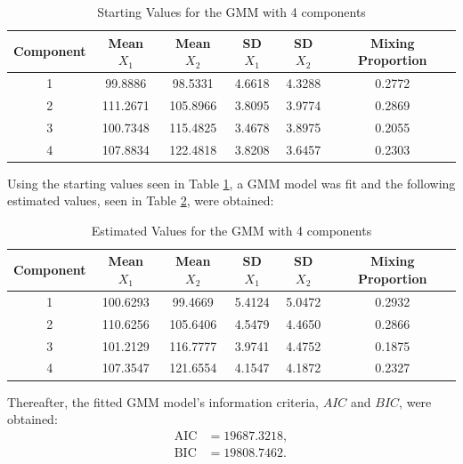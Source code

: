 \begin{enumerate}[label=\roman*.]
          \begin{table}[h]
            \centering
            \caption{Starting Values for the GMM with 4 components}
            \begin{tabular}{cccccc}
            \hline
            Component & Mean $X_1$ & Mean $X_2$ & SD $X_1$ & SD $X_2$ & Mixing Proportion \\
            \hline
            1 & 99.8886  & 98.5331  & 4.6618 & 4.3288 & 0.2772 \\
            2 & 111.2671 & 105.8966 & 3.8095 & 3.9774 & 0.2869 \\
            3 & 100.7348 & 115.4825 & 3.4678 & 3.8975 & 0.2055 \\
            4 & 107.8834 & 122.4818 & 3.8208 & 3.6457 & 0.2303 \\
            \hline
            \end{tabular}
            \label{tab:gmm_starting_values_4}
          \end{table}

          \newpage

          Using the starting values seen in Table \ref{tab:gmm_starting_values_4}, a GMM model
          was fit and the following estimated values, seen in Table \ref{tab:gmm_estimated_values_4}, were obtained:

          \begin{table}[h]
            \centering
            \caption{Estimated Values for the GMM with 4 components}
            \begin{tabular}{cccccc}
            \hline
            Component & Mean $X_1$ & Mean $X_2$ & SD $X_1$ & SD $X_2$ & Mixing Proportion \\
            \hline
            1 & 100.6293 & 99.4669  & 5.4124 & 5.0472 & 0.2932 \\
            2 & 110.6256 & 105.6406 & 4.5479 & 4.4650 & 0.2866 \\
            3 & 101.2129 & 116.7777 & 3.9741 & 4.4752 & 0.1875 \\
            4 & 107.3547 & 121.6554 & 4.1547 & 4.1872 & 0.2327 \\
            \hline
            \end{tabular}
            \label{tab:gmm_estimated_values_4}
          \end{table}     
          
          Thereafter, the fitted GMM model's information criteria, $AIC$ and $BIC$, were obtained:
            \[
            \begin{aligned}
            \text{AIC} &= 19687.3218,\\
            \text{BIC} &= 19808.7462.
            \end{aligned}
            \]


\end{enumerate}
